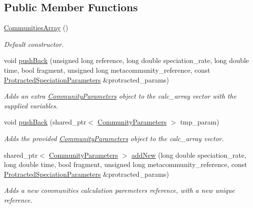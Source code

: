 \subsection*{Public Member Functions}
\begin{DoxyCompactItemize}
\item 
\hyperlink{struct_communities_array_aa95cb9477d97998cecd48b86319a513e}{Communities\+Array} ()\hypertarget{struct_communities_array_aa95cb9477d97998cecd48b86319a513e}{}\label{struct_communities_array_aa95cb9477d97998cecd48b86319a513e}

\begin{DoxyCompactList}\small\item\em Default constructor. \end{DoxyCompactList}\item 
void \hyperlink{struct_communities_array_a03dac0fa7caadfbcd54bff684d3e72fe}{push\+Back} (unsigned long reference, long double speciation\+\_\+rate, long double time, bool fragment, unsigned long metacommunity\+\_\+reference, const \hyperlink{struct_protracted_speciation_parameters}{Protracted\+Speciation\+Parameters} \&protracted\+\_\+params)
\begin{DoxyCompactList}\small\item\em Adds an extra \hyperlink{struct_community_parameters}{Community\+Parameters} object to the calc\+\_\+array vector with the supplied variables. \end{DoxyCompactList}\item 
void \hyperlink{struct_communities_array_a4603fe7f556907cc7e41364a010b21a6}{push\+Back} (shared\+\_\+ptr$<$ \hyperlink{struct_community_parameters}{Community\+Parameters} $>$ tmp\+\_\+param)
\begin{DoxyCompactList}\small\item\em Adds the provided \hyperlink{struct_community_parameters}{Community\+Parameters} object to the calc\+\_\+array vector. \end{DoxyCompactList}\item 
shared\+\_\+ptr$<$ \hyperlink{struct_community_parameters}{Community\+Parameters} $>$ \hyperlink{struct_communities_array_abf52aec551c1adcf1b3c2973edb0069f}{add\+New} (long double speciation\+\_\+rate, long double time, bool fragment, unsigned long metacommunity\+\_\+reference, const \hyperlink{struct_protracted_speciation_parameters}{Protracted\+Speciation\+Parameters} \&protracted\+\_\+params)
\begin{DoxyCompactList}\small\item\em Adds a new communities calculation paremeters reference, with a new unique reference. \end{DoxyCompactList}\item 

\end{DoxyCompactItemize}
